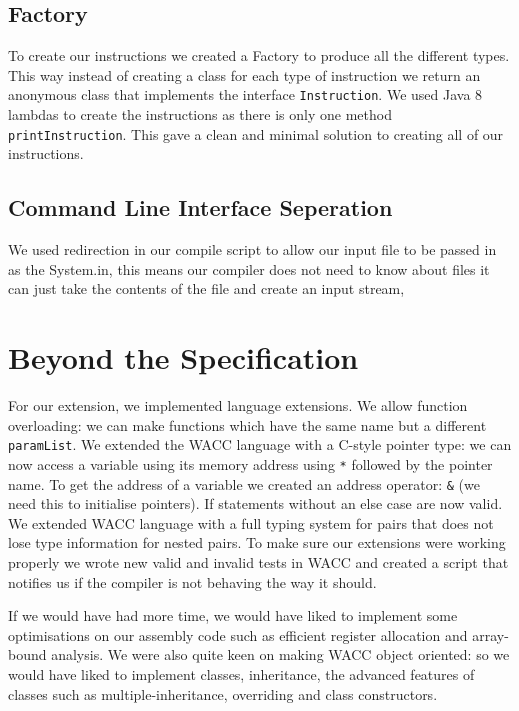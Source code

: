 \documentclass[11pt,a4paper]{article}
\begin{document}
\subsection{Factory}
\label{sub:Factory}
To create our instructions we created a Factory to produce all the different types. This way instead of creating a class for each type of instruction we return an anonymous class that implements the interface \texttt{Instruction}. We used Java 8 lambdas to create the instructions as there is only one method \texttt{printInstruction}. This gave a clean and minimal solution to creating all of our instructions.

\subsection{Command Line Interface Seperation}
\label{sub:Command Line Interface Seperation}
We used redirection in our compile script to allow our input file to be passed in as the System.in, this means our compiler does not need to know about files it can just take the contents of the file and create an input stream,

\section{Beyond the Specification}
\label{sec:Beyond the Specification}
For our extension, we implemented language extensions. We allow function overloading: we can make functions which have the same name but a different \texttt{paramList}. We extended the WACC language with a C-style pointer type: we can now access a variable using its memory address using \texttt{*} followed by the pointer name. To get the address of a variable we created an address operator: \texttt{\&} (we need this to initialise pointers). If statements without an else case are now valid. We extended WACC language with a full typing system for pairs that does not lose type information for nested pairs.
To make sure our extensions were working properly we wrote new valid and invalid tests in WACC and created a script that notifies us if the compiler is not behaving the way it should.

If we would have had more time, we would have liked to implement some optimisations on our assembly code such as efficient register allocation and array-bound analysis. We were also quite keen on making WACC object oriented: so we would have liked to implement classes, inheritance, the advanced features of classes such as multiple-inheritance, overriding and class constructors.
\end{document}
